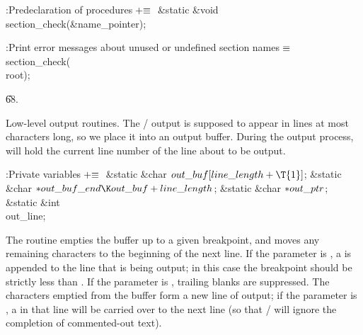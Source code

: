 \B{}:Predeclaration of procedures\X${}\mathrel+\equiv{}$\5
\&{static} \&{void} \\{section\_check}(\&{name\_pointer});\par
\fi

\B{}:Print error messages about unused or undefined section names\X${}%
\E{}$\6
\\{section\_check}(\\{root});\par
\U68.\fi

Low-level output routines.
The \TEX/ output is supposed to appear in lines at most 
characters long, so we place it into an output buffer. During the output
process,  will hold the current line number of the line about
to
be output.

\Y\B\4:Private variables\X${}\mathrel+\equiv{}$\6
\&{static} \&{char} ${}\\{out\_buf}[\\{line\_length}+\T{1}]{}$;\6
\&{static} \&{char} ${}{*}\\{out\_buf\_end}\K\\{out\_buf}+\\{line\_length}{}$;%
\6
\&{static} \&{char} ${}{*}\\{out\_ptr}{}$;\6
\&{static} \&{int} \\{out\_line};\par
\fi

The  routine empties the buffer up to a given
breakpoint,
and moves any remaining characters to the beginning of the next line.
If the  parameter is , a  is
appended to the line
that is being output; in this case the breakpoint  should be strictly
less than . If the  parameter is ,
trailing blanks are suppressed.
The characters emptied from the buffer form a new line of output;
if the  parameter is , a  in that
line will be
carried over to the next line (so that \TEX/ will ignore the completion
of commented-out text).

